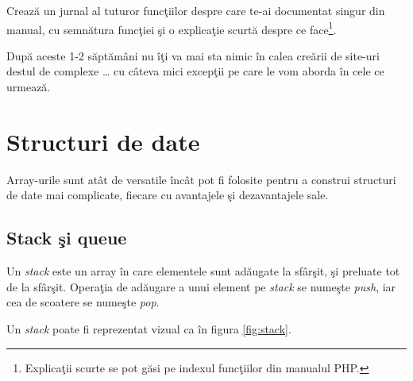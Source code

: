 \begin{Exercise}[difficulty=3,title={Explorează manualul}]
Crează un jurnal al tuturor funcţiilor despre care te-ai documentat
singur din manual, cu semnătura funcţiei şi o explicaţie scurtă
despre ce face\footnote{Explicaţii scurte se pot găsi pe indexul
funcţiilor din manualul PHP.}.

După aceste 1-2 săptămâni nu îţi va mai sta nimic în calea creării
de site-uri destul de complexe {\ldots} cu câteva mici excepţii pe care le vom
aborda \^in cele ce urmează.
\end{Exercise}








\section{Structuri de date}
Array-urile sunt atât de versatile încât pot fi folosite
pentru a construi structuri de date mai complicate, fiecare
cu avantajele şi dezavantajele sale.

\subsection{Stack şi queue}
Un \textsl{stack} este un array în care elementele sunt adăugate la sfârşit,
şi preluate tot de la sfârşit. Operaţia de adăugare a unui element
pe \textit{stack} se numeşte \textsl{push}, iar cea de scoatere se numeşte \textsl{pop}.

Un \textit{stack} poate fi reprezentat vizual ca în figura \ref{fig:stack}.

